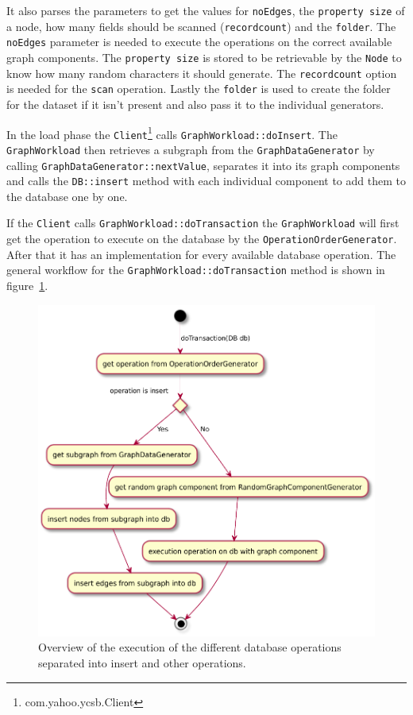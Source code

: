 It also parses the parameters to get the values for \texttt{noEdges},
the \texttt{property size} of a node,
how many fields should be scanned (\texttt{recordcount}) and the \texttt{folder}.
The \texttt{noEdges} parameter is needed to execute the operations on the correct available graph components.
The \texttt{property size} is stored to be retrievable by the \texttt{Node} to know how many random characters it should generate.
The \texttt{recordcount} option is needed for the \texttt{scan} operation.
Lastly the \texttt{folder} is used to create the folder for the dataset if it isn't present and also pass it to the individual generators.

In the load phase the \texttt{Client}\footnote{com.yahoo.ycsb.Client} calls \texttt{GraphWorkload::doInsert}.
The \texttt{GraphWorkload} then retrieves a subgraph from the \texttt{GraphDataGenerator} by calling \texttt{GraphDataGenerator::nextValue},
separates it into its graph components and calls the \texttt{DB::insert} method with each individual component to add them to the database one by one.

If the \texttt{Client} calls \texttt{GraphWorkload::doTransaction} the \texttt{GraphWorkload} will first get the operation to execute on the database by the \texttt{OperationOrderGenerator}.
After that it has an implementation for every available database operation.
The general workflow for the \texttt{GraphWorkload::doTransaction} method is shown in figure~\ref{fig:graphWorkloadExecution}.

\begin{figure}[h!]
  \includegraphics[width=\textwidth]{images/extensions/graphWorkloadExecution}
  \caption{Overview of the execution of the different database operations separated into insert and other operations.}
  \label{fig:graphWorkloadExecution}
\end{figure}

